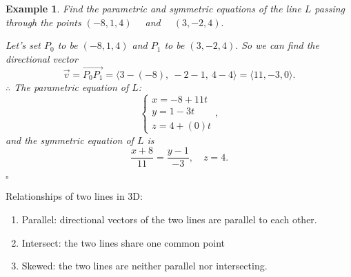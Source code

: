 \documentclass[12pt,a4paper]{article}
\newtheorem{eg}{Example}[subsection]
\newenvironment*{ans}{\par\indent{\textit{Answer. }}\par}{\par\hfill{$\square$}\par}
\def\vecv{\vec{v}}
\begin{document}
\begin{eg}
	Find the parametric and symmetric equations of the line $L$ passing through the points $(-8,1,4)\quad$ and $\quad (3,-2,4).$
	\begin{ans}
		Let's set $P_0$ to be $(-8,1,4)$ and $P_1$ to be $(3,-2,4).$ So we can find the directional vector \[\vecv=\overrightarrow{P_0P_1}=\langle3-(-8),\ -2-1,\ 4-4\rangle=\langle11,-3,0\rangle.\]
		$\therefore$ The parametric equation of $L$: \[\begin{cases}x=-8+11t\\y=1-3t\\z=4+(0)t\end{cases}, \]
		and the symmetric equation of $L$ is \[\frac{x+8}{11}=\frac{y-1}{-3},\quad z=4.\]
	\end{ans}
\end{eg}
Relationships of two lines in 3D: 
\begin{enumerate}
	\item Parallel: directional vectors of the two lines are parallel to each other.
	\item Intersect: the two lines share one common point
	\item Skewed: the two lines are neither parallel nor intersecting. 
\end{enumerate}
\end{document}
